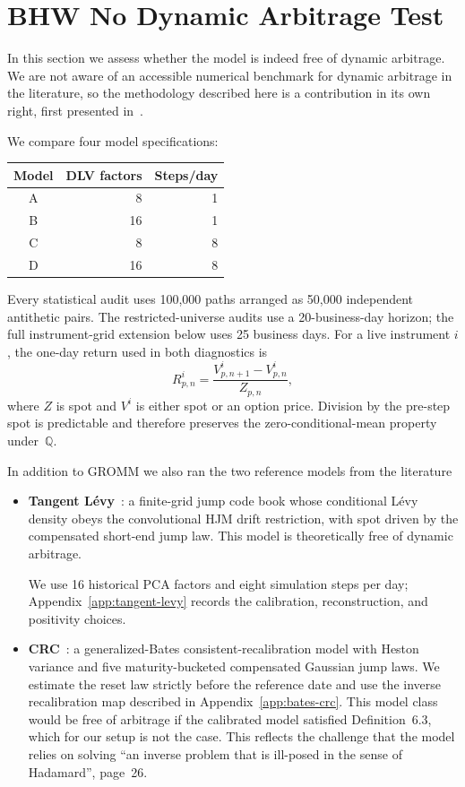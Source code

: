 \documentclass[smallextended,envcountsame,envcountsect]{svjour3}
\newcommand{\Q}{\mathbb Q}
\begin{document}
\section{BHW No Dynamic Arbitrage Test}\label{sec:numerics}

In this section we assess whether the model is indeed free of dynamic arbitrage.
We are not aware of an accessible numerical benchmark for dynamic arbitrage in the literature, so
the methodology described here is a contribution in its own right, first presented in~\citet{DYSANOS2026}.

We compare four model specifications:
\begin{center}
\begin{tabular}{crr}
\toprule
Model & DLV factors & Steps/day\\
\midrule
A & 8  & 1\\
B & 16 & 1\\
C & 8  & 8\\
D & 16 & 8\\
\bottomrule
\end{tabular}
\end{center}
Every statistical audit uses 100,000 paths arranged as 50,000 independent antithetic
pairs.  The restricted-universe audits use a 20-business-day horizon; the full
instrument-grid extension below uses 25 business days.  For a live instrument $i$, the
one-day return used in both diagnostics is
\begin{equation}\label{eq:numerics-spot-scaled-return}
  R_{p,n}^i
  =\frac{V_{p,n+1}^i-V_{p,n}^i}{Z_{p,n}},
\end{equation}
where $Z$ is spot and $V^i$ is either spot or an option price.  Division by the
pre-step spot is predictable and therefore preserves the zero-conditional-mean
property under~$\Q$.

In addition to GROMM we also ran the two reference models from the literature
\begin{itemize}
  \item \textbf{Tangent L\'evy}~\citep{TangentLevy}: a finite-grid jump code book
  whose conditional L\'evy density obeys the convolutional HJM drift restriction,
  with spot driven by the compensated short-end jump law. This model is theoretically
  free of dynamic arbitrage.

  We use 16 historical
  PCA factors and eight simulation steps per day; Appendix~\ref{app:tangent-levy}
  records the calibration, reconstruction, and positivity choices.

  \item \textbf{CRC}~\citep{DysLitGambaraTeichmann2021}: a generalized-Bates
  consistent-recalibration model with Heston variance and five
  maturity-bucketed compensated Gaussian jump laws.  We estimate the reset
  law strictly before the reference date and use the inverse recalibration
  map described in Appendix~\ref{app:bates-crc}. This model class would be free of arbitrage
  if the calibrated model satisfied Definition~6.3, which for our setup is
  not the case. This reflects the challenge that the model relies on solving
  ``an inverse problem that is ill-posed in the sense of Hadamard'', page~26.
\end{itemize}
\end{document}
